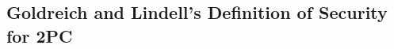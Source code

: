 \documentclass[12pt,twoside]{reedthesis}
\newcommand{\Enc}{\operatorname{Enc}}
\newenvironment{blockquote}{%
  \par%
  \medskip
  \leftskip=4em\rightskip=2em%
  \noindent\ignorespaces}{%
  \par\medskip}
\begin{document}
%
%
%

\subsection{Goldreich and Lindell's Definition of Security for 2PC}
\end{document}
